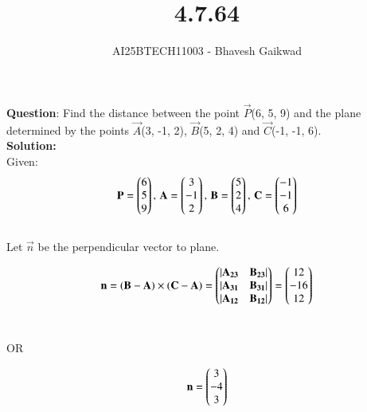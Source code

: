 \documentclass[journal]{IEEEtran}
\begin{document}

\vspace{3cm}

\title{4.7.64}
\author{AI25BTECH11003 - Bhavesh Gaikwad}
{\let\newpage\relax\maketitle}

\renewcommand{\thefigure}{\theenumi}
\renewcommand{\thetable}{\theenumi}
\setlength{\intextsep}{10pt} 


\renewcommand{\thetable}{\theenumi}


\textbf{Question}: Find the distance between the point $\vec{P}$(6, 5, 9) and the plane determined by the points $\vec{A}$(3, -1, 2), $\vec{B}$(5, 2, 4) and $\vec{C}$(-1, -1, 6). \\

\textbf{Solution:}\\
Given:
\begin{equation}
\mathbf{P} = \begin{pmatrix}6 \\ 5 \\ 9\end{pmatrix}, \, \mathbf{A} = \begin{pmatrix}3 \\ -1 \\ 2\end{pmatrix}, \, \mathbf{B} = \begin{pmatrix}5 \\ 2 \\ 4\end{pmatrix}, \, \mathbf{C} = \begin{pmatrix}-1 \\ -1 \\ 6\end{pmatrix}
\end{equation}\\

Let $\vec{n}$ be the perpendicular vector to plane.

\begin{equation}
    \mathbf{n} = \mathbf{(B-A)} \times \mathbf{(C-A)} = \begin{pmatrix}|\mathbf{A_{23}} & \mathbf{B_{23}}| \\ |\mathbf{A_{31}} & \mathbf{B_{31}}| \\ |\mathbf{A_{12}} & \mathbf{B_{12}}|\end{pmatrix} = \begin{pmatrix}12 \\ -16 \\ 12\end{pmatrix}
\end{equation}\\

\begin{center}
    OR
\end{center}

\begin{equation}
\mathbf{n} = \begin{pmatrix}3 \\ -4 \\ 3\end{pmatrix}
\end{equation}\\
\end{document}
